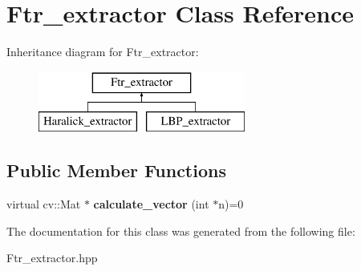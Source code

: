 \hypertarget{class_ftr__extractor}{\section{Ftr\+\_\+extractor Class Reference}
\label{class_ftr__extractor}
}
Inheritance diagram for Ftr\+\_\+extractor\+:\begin{figure}[H]
\begin{center}
\leavevmode
\includegraphics[height=2.000000cm]{class_ftr__extractor}
\end{center}
\end{figure}
\subsection*{Public Member Functions}
\begin{DoxyCompactItemize}
\item 
\hypertarget{class_ftr__extractor_ab0a51d506904dd8b93b3861dd2320ef6}{virtual cv\+::\+Mat $\ast$ {\bfseries calculate\+\_\+vector} (int $\ast$n)=0}\label{class_ftr__extractor_ab0a51d506904dd8b93b3861dd2320ef6}

\end{DoxyCompactItemize}


The documentation for this class was generated from the following file\+:\begin{DoxyCompactItemize}
\item 
Ftr\+\_\+extractor.\+hpp\end{DoxyCompactItemize}
